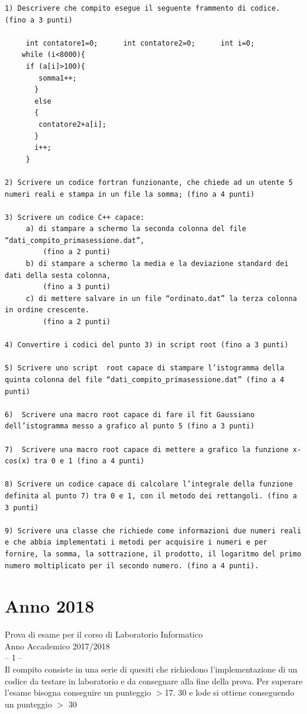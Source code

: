 \documentclass[11pt,fleqn]{book} %
\begin{document}
\begin{verbatim}
1) Descrivere che compito esegue il seguente frammento di codice. (fino a 3 punti)

     int contatore1=0;      int contatore2=0;      int i=0;
    while (i<8000){
     if (a[i]>100){
        somma1++;
       }
       else
       {
        contatore2+a[i];
       }
       i++;
     }
       
2) Scrivere un codice fortran funzionante, che chiede ad un utente 5 numeri reali e stampa in un file la somma; (fino a 4 punti)

3) Scrivere un codice C++ capace:
     a) di stampare a schermo la seconda colonna del file “dati_compito_primasessione.dat”, 
         (fino a 2 punti)
     b) di stampare a schermo la media e la deviazione standard dei dati della sesta colonna,
         (fino a 3 punti)
     c) di mettere salvare in un file “ordinato.dat” la terza colonna in ordine crescente.
         (fino a 2 punti)

4) Convertire i codici del punto 3) in script root (fino a 3 punti)

5) Scrivere uno script  root capace di stampare l’istogramma della quinta colonna del file “dati_compito_primasessione.dat” (fino a 4 punti)

6)  Scrivere una macro root capace di fare il fit Gaussiano dell’istogramma messo a grafico al punto 5 (fino a 3 punti)

7)  Scrivere una macro root capace di mettere a grafico la funzione x-cos(x) tra 0 e 1 (fino a 4 punti)

8) Scrivere un codice capace di calcolare l’integrale della funzione definita al punto 7) tra 0 e 1, con il metodo dei rettangoli. (fino a 3 punti)

9) Scrivere una classe che richiede come informazioni due numeri reali e che abbia implementati i metodi per acquisire i numeri e per fornire, la somma, la sottrazione, il prodotto, il logaritmo del primo numero moltiplicato per il secondo numero. (fino a 4 punti).
\end{verbatim}
\newpage
\section{Anno 2018}

\thispagestyle{empty}
{
\Large\centering
Prova di esame per il corso di Laboratorio Informatico\\		
Anno Accademico 2017/2018\\
-- 1 --\\
}
{
\small\centering
Il compito consiste in una serie di quesiti che richiedono l’implementazione di un codice da testare in laboratorio e da consegnare alla fine della prova. Per superare l’esame bisogna conseguire un punteggio $>$17.  
30 e lode si ottiene conseguendo un punteggio $>$ 30
}
\end{document}
